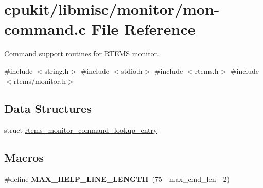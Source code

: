 \hypertarget{mon-command_8c}{}\section{cpukit/libmisc/monitor/mon-\/command.c File Reference}
\label{mon-command_8c}


Command support routines for R\+T\+E\+MS monitor.  


{\ttfamily \#include $<$string.\+h$>$}\newline
{\ttfamily \#include $<$stdio.\+h$>$}\newline
{\ttfamily \#include $<$rtems.\+h$>$}\newline
{\ttfamily \#include $<$rtems/monitor.\+h$>$}\newline
\subsection*{Data Structures}
\begin{DoxyCompactItemize}
\item 
struct \mbox{\hyperlink{structrtems__monitor__command__lookup__entry}{rtems\+\_\+monitor\+\_\+command\+\_\+lookup\+\_\+entry}}
\end{DoxyCompactItemize}
\subsection*{Macros}
\begin{DoxyCompactItemize}
\item 
\mbox{\label{mon-command_8c_a0b317443c74c8a536e2cebf73d5a6ae4}} 
\#define {\bfseries M\+A\+X\+\_\+\+H\+E\+L\+P\+\_\+\+L\+I\+N\+E\+\_\+\+L\+E\+N\+G\+TH}~(75 -\/ max\+\_\+cmd\+\_\+len -\/ 2)
\end{DoxyCompactItemize}
